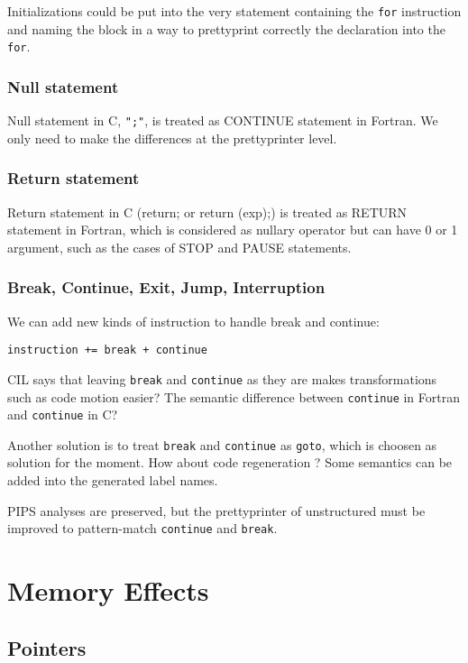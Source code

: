 \documentclass[a4paper]{report}
\begin{document}
Initializations could be put into the very statement containing the
\texttt{for} instruction and naming the block in a way to prettyprint
correctly the declaration into the \texttt{for}.

\subsection{Null statement}
Null statement in C, \verb/";"/, is treated as CONTINUE statement in
Fortran. We only need to make the differences at the prettyprinter
level.

\subsection{Return statement}
Return statement in C (return; or return (exp);) is treated as RETURN statement in Fortran, which is
considered as nullary operator but can have 0 or 1 argument, such as the
cases of STOP and PAUSE statements. 

\subsection{Break, Continue, Exit, Jump, Interruption}

We can add new kinds of instruction to handle break and continue: 

\verb/instruction += break + continue /

CIL says that leaving \verb/break/ and \verb/continue/ as they are
makes transformations such as code motion easier? The semantic
difference between \verb/continue/ in Fortran and \verb/continue/ in
C?

Another solution is to treat \verb/break/ and \verb/continue/ as
\verb/goto/, which is choosen as solution for the moment. How about code
regeneration ? Some semantics can be added into the generated label names.

PIPS analyses are preserved, but the prettyprinter of unstructured
must be improved to pattern-match \verb/continue/ and \verb/break/.

\chapter{Memory Effects}
\label{chapter:memory-effects}

\section{Pointers}
\end{document}
